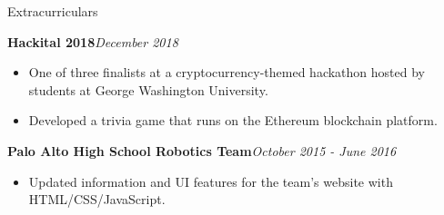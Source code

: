 \documentclass{resume} %
\begin{document}
\begin{rSection}{Extracurriculars} \itemsep -3pt
\begin{rSubsection}{\bf Hackital 2018}{\em December 2018}{}{}
\begin{itemize}
    \item One of three finalists at a cryptocurrency-themed hackathon hosted by students at George Washington University. \vspace{-0.6em}
    \item Developed a trivia game that runs on the Ethereum blockchain platform.
\end{itemize}
\end{rSubsection}

\begin{rSubsection}{{\bf Palo Alto High School Robotics Team}}{\em October 2015 - June 2016}{}{}
\begin{itemize}
    \item Updated information and UI features for the team's website with HTML/CSS/JavaScript.
\end{itemize}
\end{rSubsection}

\end{rSection}



\end{document}
